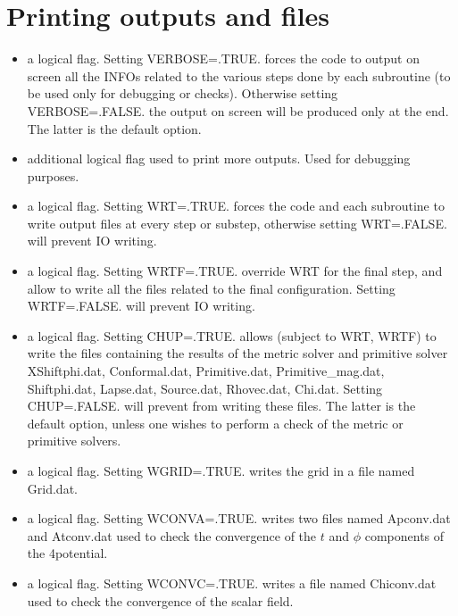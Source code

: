 \documentclass[letterpaper,10pt,english]{sphinxmanual}
\begin{document}
\section{Printing outputs and files}
\label{\detokenize{user_params:printing-outputs-and-files}}\begin{itemize}
\item {} 
\sphinxAtStartPar
{} \sphinxhyphen{} a logical flag. Setting VERBOSE=.TRUE. forces the code to output on screen all the INFOs
related to the various steps done by each subroutine (to be used only for debugging or checks). Otherwise setting VERBOSE=.FALSE. the output on screen will be produced only at the end. The latter is
the default option.


\item {} 
\sphinxAtStartPar
{} \sphinxhyphen{} additional logical flag used to print more outputs. Used for debugging purposes.


\item {} 
\sphinxAtStartPar
{} \sphinxhyphen{} a logical flag. Setting WRT=.TRUE. forces the code and each subroutine to write output files
at every step or substep, otherwise setting WRT=.FALSE. will prevent IO writing.


\item {} 
\sphinxAtStartPar
{} \sphinxhyphen{} a logical flag. Setting WRTF=.TRUE. override WRT for the final step, and allow to write all the
files related to the final configuration. Setting WRTF=.FALSE. will prevent IO writing.


\item {} 
\sphinxAtStartPar
{} \sphinxhyphen{} a logical flag. Setting CHUP=.TRUE. allows (subject to WRT, WRTF) to write the files containing the results of the metric solver and primitive solver XShiftphi.dat, Conformal.dat, Primitive.dat,
Primitive\_mag.dat, Shiftphi.dat, Lapse.dat, Source.dat, Rhovec.dat, Chi.dat. Setting CHUP=.FALSE. will prevent from writing these files. The latter is the default option, unless one wishes to perform a check of the metric or primitive solvers.


\item {} 
\sphinxAtStartPar
{} \sphinxhyphen{} a logical flag. Setting WGRID=.TRUE. writes the grid in a file named Grid.dat.


\item {} 
\sphinxAtStartPar
{} \sphinxhyphen{} a logical flag. Setting WCONVA=.TRUE. writes two files named Apconv.dat and Atconv.dat used to check the convergence of the \(t\) and \(\phi\) components of the 4\sphinxhyphen{}potential.


\item {} 
\sphinxAtStartPar
{} \sphinxhyphen{}  a logical flag. Setting WCONVC=.TRUE. writes a file named Chiconv.dat used to check the convergence of the scalar field.

\end{itemize}
\end{document}
